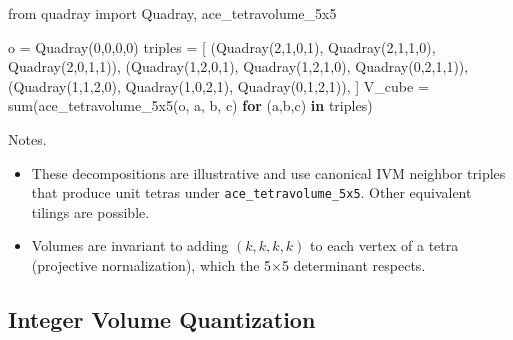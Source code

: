 \documentclass[
  10pt,
]{article}
\newenvironment{Shaded}{}{}
\newcommand{\BuiltInTok}[1]{#1}
\newcommand{\ControlFlowTok}[1]{\textcolor[rgb]{0.00,0.44,0.13}{\textbf{#1}}}
\newcommand{\DecValTok}[1]{\textcolor[rgb]{0.25,0.63,0.44}{#1}}
\newcommand{\ImportTok}[1]{#1}
\newcommand{\KeywordTok}[1]{\textcolor[rgb]{0.00,0.44,0.13}{\textbf{#1}}}
\newcommand{\NormalTok}[1]{#1}
\newcommand{\OperatorTok}[1]{\textcolor[rgb]{0.40,0.40,0.40}{#1}}
\providecommand{\tightlist}{%
  \setlength{\itemsep}{0pt}\setlength{\parskip}{0pt}}
\begin{document}
\begin{Shaded}
\begin{Highlighting}[]
\ImportTok{from}\NormalTok{ quadray }\ImportTok{import}\NormalTok{ Quadray, ace\_tetravolume\_5x5}

\NormalTok{o }\OperatorTok{=}\NormalTok{ Quadray(}\DecValTok{0}\NormalTok{,}\DecValTok{0}\NormalTok{,}\DecValTok{0}\NormalTok{,}\DecValTok{0}\NormalTok{)}
\NormalTok{triples }\OperatorTok{=}\NormalTok{ [}
\NormalTok{    (Quadray(}\DecValTok{2}\NormalTok{,}\DecValTok{1}\NormalTok{,}\DecValTok{0}\NormalTok{,}\DecValTok{1}\NormalTok{), Quadray(}\DecValTok{2}\NormalTok{,}\DecValTok{1}\NormalTok{,}\DecValTok{1}\NormalTok{,}\DecValTok{0}\NormalTok{), Quadray(}\DecValTok{2}\NormalTok{,}\DecValTok{0}\NormalTok{,}\DecValTok{1}\NormalTok{,}\DecValTok{1}\NormalTok{)),}
\NormalTok{    (Quadray(}\DecValTok{1}\NormalTok{,}\DecValTok{2}\NormalTok{,}\DecValTok{0}\NormalTok{,}\DecValTok{1}\NormalTok{), Quadray(}\DecValTok{1}\NormalTok{,}\DecValTok{2}\NormalTok{,}\DecValTok{1}\NormalTok{,}\DecValTok{0}\NormalTok{), Quadray(}\DecValTok{0}\NormalTok{,}\DecValTok{2}\NormalTok{,}\DecValTok{1}\NormalTok{,}\DecValTok{1}\NormalTok{)),}
\NormalTok{    (Quadray(}\DecValTok{1}\NormalTok{,}\DecValTok{1}\NormalTok{,}\DecValTok{2}\NormalTok{,}\DecValTok{0}\NormalTok{), Quadray(}\DecValTok{1}\NormalTok{,}\DecValTok{0}\NormalTok{,}\DecValTok{2}\NormalTok{,}\DecValTok{1}\NormalTok{), Quadray(}\DecValTok{0}\NormalTok{,}\DecValTok{1}\NormalTok{,}\DecValTok{2}\NormalTok{,}\DecValTok{1}\NormalTok{)),}
\NormalTok{]}
\NormalTok{V\_cube }\OperatorTok{=} \BuiltInTok{sum}\NormalTok{(ace\_tetravolume\_5x5(o, a, b, c) }\ControlFlowTok{for}\NormalTok{ (a,b,c) }\KeywordTok{in}\NormalTok{ triples)}
\end{Highlighting}
\end{Shaded}

Notes.

\begin{itemize}
\tightlist
\item
  These decompositions are illustrative and use canonical IVM neighbor
  triples that produce unit tetras under \texttt{ace\_tetravolume\_5x5}.
  Other equivalent tilings are possible.
\item
  Volumes are invariant to adding \((k,k,k,k)\) to each vertex of a
  tetra (projective normalization), which the 5×5 determinant respects.
\end{itemize}

\hypertarget{sec:integer_volume}{%
\subsection{Integer Volume Quantization}\label{sec:integer_volume}}
\end{document}
